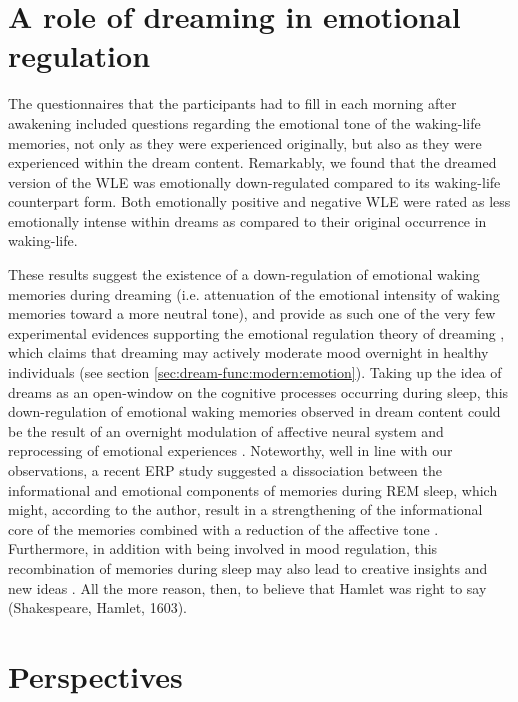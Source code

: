\section{A role of dreaming in emotional regulation}
\label{disc:drf:summary:regulation}

The questionnaires that the participants had to fill in each morning after awakening included questions regarding the emotional tone of the waking-life memories, not only as they were experienced originally, but also as they were experienced within the dream content. Remarkably, we found that the dreamed version of the WLE was emotionally down-regulated compared to its waking-life counterpart form. Both emotionally positive and negative WLE were rated as less emotionally intense within dreams as compared to their original occurrence in waking-life.

These results suggest the existence of a down-regulation of emotional waking memories during dreaming (i.e. attenuation of the emotional intensity of waking memories toward a more neutral tone), and provide as such one of the very few experimental evidences supporting the emotional regulation theory of dreaming \citep{cartwright_role_1998, cartwright_role_1998-1, perogamvros_roles_2012}, which claims that dreaming may actively moderate mood overnight in healthy individuals (see section \ref{sec:dream-func:modern:emotion}). Taking up the idea of dreams as an open-window on the cognitive processes occurring during sleep, this down-regulation of emotional waking memories observed in dream content could be the result of an overnight modulation of affective neural system and reprocessing of emotional experiences \citep{walker_overnight_2009, goldstein_role_2014}. Noteworthy, well in line with our observations, a recent ERP study suggested a dissociation between the informational and emotional components of memories during REM sleep, which might, according to the author, result in a strengthening of the informational core of the memories combined with a reduction of the affective tone \citep{groch_role_2013}. Furthermore, in addition with being involved in mood regulation, this recombination of memories during sleep may also lead to creative insights and new ideas \citep{maquet_psychology:_2004, payne_sleep_2004, edwards_dreaming_2013, barrett_dreams_2017}. All the more reason, then, to believe that Hamlet was right to say  (Shakespeare, Hamlet, 1603).

\section{Perspectives}
\label{disc:drf:summary:perspectives}


